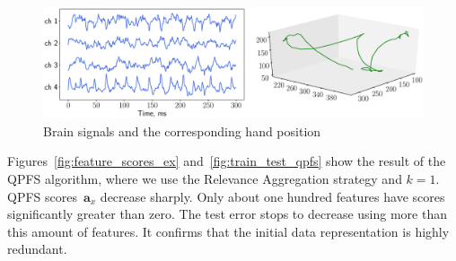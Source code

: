 \documentclass[12pt,twoside]{article}
\theoremstyle{definition}
\newcommand{\ba}{\mathbf{a}}
\begin{document}
\begin{figure}
	\centering
	\includegraphics[width=\linewidth]{figs/ecog_data}
	\caption{Brain signals and the corresponding hand position}
	\label{fig:ecog_data}
\end{figure}

Figures~\ref{fig:feature_scores_ex} and~\ref{fig:train_test_qpfs} show the result of the QPFS algorithm, where we use the Relevance Aggregation strategy and $k = 1$.
QPFS scores~$\ba_x$ decrease sharply.
Only about one hundred features have scores significantly greater than zero.
The test error stops to decrease using more than this amount of features.
It confirms that the initial data representation is highly redundant.
\end{document}
